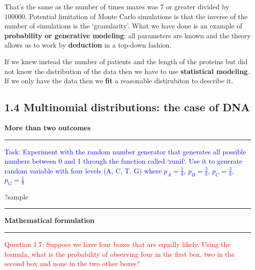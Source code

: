 \documentclass[]{article}
\newenvironment{Shaded}{\begin{snugshade}}{\end{snugshade}}
\newcommand{\NormalTok}[1]{#1}
\let\oldrule=\rule
\renewcommand{\rule}[1]{\oldrule{\linewidth}}
\begin{document}
That's the same as the number of times maxes was 7 or greater divided by
100000. Potential limitation of Monte Carlo simulations is that the
inverse of the number of simulations is the `granularity'. What we have
done is an example of \textbf{probability or generative modeling}: all
parameters are known and the theory allows us to work by
\textbf{deduction} in a top-down fashion.

If we knew instead the number of patients and the length of the proteins
but did not know the distribution of the data then we have to use
\textbf{statistical modeling}. If we only have the data then we
\textbf{fit} a reasonable distirubiton to describe it.

\subsection{1.4 Multinomial distributions: the case of
DNA}\label{multinomial-distributions-the-case-of-dna}

\textbf{More than two outcomes}

\begin{center}\rule{0.5\linewidth}{\linethickness}\end{center}

\textcolor{blue}{Task: Experiment with the random number generator that generates all possible numbers between 0 and 1 through the function called `runif`. Use it to generate  random variable with four levels (A, C, T, G) where $p_A = \frac{1}{8}$, $p_B = \frac{3}{8}$, $p_C = \frac{3}{8}$, $p_G = \frac{1}{8}$}

\begin{Shaded}
\begin{Highlighting}[]
\NormalTok{?sample}
\end{Highlighting}
\end{Shaded}

\begin{center}\rule{0.5\linewidth}{\linethickness}\end{center}

\textbf{Mathematical formulation}

\begin{center}\rule{0.5\linewidth}{\linethickness}\end{center}

\textcolor{red}{Question 1.7: Suppose we have four boxes that are equally likely. Using the formula, what is the probability of observing four in the first box, two in the second box and none in the two other boxes?}
\end{document}
